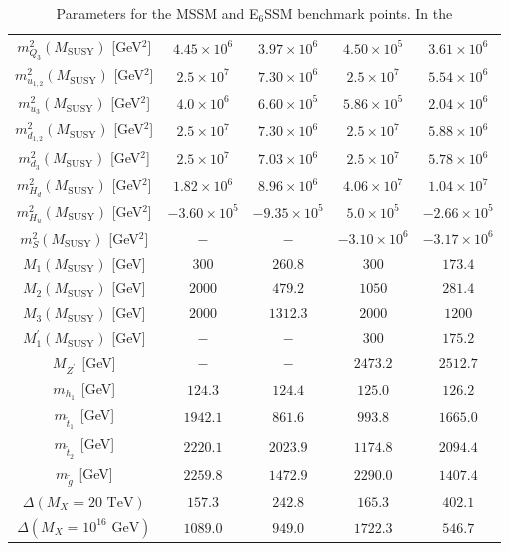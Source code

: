 \documentclass[preprint,amsmath,amssymb,aps,superscriptaddress,prd,
showpacs,floatfix,nofootinbib]{revtex4-1}
\begin{document}
\begin{table}[h]
\begin{ruledtabular}
\begin{tabular}{ccccc}
$m_{Q_3}^2(M_{\mathrm{SUSY}})$ [GeV$^2$] & $4.45\times 10^6$ &
$3.97\times 10^6$ & $4.50\times 10^5$ & $3.61\times 10^6$ \\
$m_{u_{1,2}}^2(M_{\mathrm{SUSY}})$ [GeV$^2$] & $2.5\times 10^7$ &
$7.30\times 10^6$ & $2.5\times 10^7$ & $5.54\times 10^6$ \\
$m_{u_3}^2(M_{\mathrm{SUSY}})$ [GeV$^2$] & $4.0 \times 10^6$ &
$6.60\times10^5$& $5.86\times 10^5$ & $2.04\times 10^6$ \\
$m_{d_{1,2}}^2(M_{\mathrm{SUSY}})$ [GeV$^2$] & $2.5\times 10^7$ &
$7.30\times 10^6$ & $2.5\times 10^7$ & $5.88\times 10^6$ \\
$m_{d_3}^2(M_{\mathrm{SUSY}})$ [GeV$^2$] & $2.5\times 10^7$ &
$7.03\times 10^6$ & $2.5\times 10^7$ & $5.78\times 10^6$ \\
$m_{H_d}^2(M_{\mathrm{SUSY}})$ [GeV$^2$] & $1.82\times 10^6$ &
$8.96\times 10^6$ & $4.06\times 10^7$ & $1.04\times 10^7$ \\
$m_{H_u}^2(M_{\mathrm{SUSY}})$ [GeV$^2$] & $-3.60\times 10^5$ &
$-9.35\times 10^5$ & $5.0\times 10^5$ & $-2.66\times 10^5$ \\
$m_S^2(M_{\mathrm{SUSY}})$ [GeV$^2$] & $-$ & $-$ & $-3.10\times 10^6$ &
$-3.17 \times 10^6$ \\
$M_1(M_{\mathrm{SUSY}})$ [GeV] & $300$ & $260.8$ & $300$ & $173.4$ \\
$M_2(M_{\mathrm{SUSY}})$ [GeV] & $2000$ & $479.2$ & $1050$ & $281.4$ \\
$M_3(M_{\mathrm{SUSY}})$ [GeV] & $2000$ & $1312.3$ & $2000$ & $1200$ \\
$M_1^\prime(M_{\mathrm{SUSY}})$ [GeV] & $-$ & $-$ & $300$ & $175.2$ \\
\hline
$M_{Z^\prime}$ [GeV] & $-$ & $-$ & $2473.2$ & $2512.7$ \\
$m_{h_1}$ [GeV] & $124.3$ & $124.4$ & $125.0$ & $126.2$ \\
$m_{\tilde{t}_1}$ [GeV] & $1942.1$ & $861.6$ & $993.8$ & $1665.0$ \\
$m_{\tilde{t}_2}$ [GeV] & $2220.1$ & $2023.9$ & $1174.8$ & $2094.4$ \\
$m_{\tilde{g}}$ [GeV] & $2259.8$ & $1472.9$ & $2290.0$ & $1407.4$ \\
\hline
$\Delta(M_X=20\textrm{ TeV})$ & $157.3$ & $242.8$ & $165.3$ & $402.1$ \\
$\Delta(M_X=10^{16}\textrm{ GeV})$ & $1089.0$ & $949.0$ & $1722.3$ & $546.7$
\end{tabular}
\end{ruledtabular}
\caption{Parameters for the MSSM and E$_6$SSM benchmark points.  In the
}
\end{table}
\end{document}
